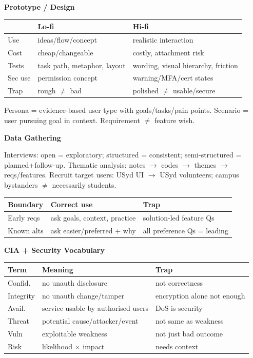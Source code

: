 \documentclass[8pt]{extarticle}
\newcommand{\h}[1]{\vspace{1pt}\textbf{#1}\par}
\begin{document}
\begin{multicols*}{5}
\h{Prototype / Design}
\begin{tabularx}{\linewidth}{@{}lYY@{}}
\toprule
 & Lo-fi & Hi-fi\\ \midrule
Use & ideas/flow/concept & realistic interaction\\
Cost & cheap/changeable & costly, attachment risk\\
Tests & task path, metaphor, layout & wording, visual hierarchy, friction\\
Sec use & permission concept & warning/MFA/cert states\\
Trap & rough $\ne$ bad & polished $\ne$ usable/secure\\
\bottomrule
\end{tabularx}
Persona = evidence-based user type with goals/tasks/pain points. Scenario = user pursuing goal in context. Requirement $\ne$ feature wish.

\h{Data Gathering}
Interviews: open = exploratory; structured = consistent; semi-structured = planned+follow-up. Thematic analysis: notes $\to$ codes $\to$ themes $\to$ reqs/features. Recruit target users: USyd UI $\to$ USyd volunteers; campus bystanders $\ne$ necessarily students.
\begin{tabularx}{\linewidth}{@{}lYY@{}}
\toprule
Boundary & Correct use & Trap\\ \midrule
Early reqs & ask goals, context, practice & solution-led feature Qs\\
Known alts & ask easier/preferred + why & all preference Qs = leading\\
\bottomrule
\end{tabularx}

\h{CIA + Security Vocabulary}
\begin{tabularx}{\linewidth}{@{}lYY@{}}
\toprule
Term & Meaning & Trap\\ \midrule
Confid. & no unauth disclosure & not correctness\\
Integrity & no unauth change/tamper & encryption alone not enough\\
Avail. & service usable by authorised users & DoS is security\\
Threat & potential cause/attacker/event & not same as weakness\\
Vuln & exploitable weakness & not just bad outcome\\
Risk & likelihood $\times$ impact & needs context\\
\bottomrule
\end{tabularx}


\end{multicols*}
\end{document}
